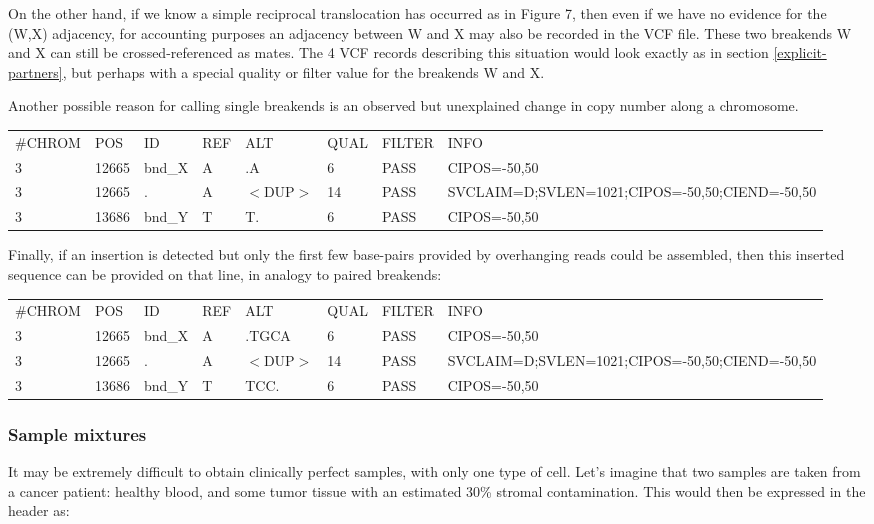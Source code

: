 \documentclass[8pt]{article}
\begin{document}
On the other hand, if we know a simple reciprocal translocation has occurred as in Figure 7, then even if we have no evidence for the (W,X) adjacency, for accounting purposes an adjacency between W and X may also be recorded in the VCF file.
These two breakends W and X can still be crossed-referenced as mates.
The 4 VCF records describing this situation would look exactly as in section \ref{explicit-partners}, but perhaps with a special quality or filter value for the breakends W and X.

Another possible reason for calling single breakends is an observed but unexplained change in copy number along a chromosome.

\vspace{0.3cm}
\scriptsize
\begin{tabular}{ l l l l l l l l }
\#CHROM & POS & ID & REF & ALT & QUAL & FILTER & INFO \\
3 & 12665 & bnd\_X & A & .A & 6 & PASS & CIPOS=-50,50 \\
3 & 12665 & . & A & $<$DUP$>$ & 14 & PASS & SVCLAIM=D;SVLEN=1021;CIPOS=-50,50;CIEND=-50,50 \\
3 & 13686 & bnd\_Y & T & T. & 6 & PASS & CIPOS=-50,50 \\
\end{tabular}
\normalsize
\vspace{0.3cm}

Finally, if an insertion is detected but only the first few base-pairs provided by overhanging reads could be assembled, then this inserted sequence can be provided on that line, in analogy to paired breakends:

\vspace{0.3cm}
\scriptsize
\begin{tabular}{ l l l l l l l l }
\#CHROM & POS & ID & REF & ALT & QUAL & FILTER & INFO \\
3 & 12665 & bnd\_X & A & .TGCA & 6 & PASS & CIPOS=-50,50 \\
3 & 12665 & . & A & $<$DUP$>$ & 14 & PASS & SVCLAIM=D;SVLEN=1021;CIPOS=-50,50;CIEND=-50,50 \\
3 & 13686 & bnd\_Y & T & TCC. & 6 & PASS & CIPOS=-50,50 \\
\end{tabular}
\normalsize

\subsubsection{Sample mixtures}
It may be extremely difficult to obtain clinically perfect samples, with only one type of cell.
Let's imagine that two samples are taken from a cancer patient: healthy blood, and some tumor tissue with an estimated 30\% stromal contamination.
This would then be expressed in the header as:
\end{document}
